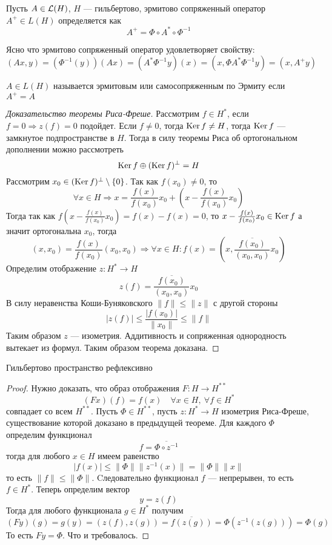 \begin{definition}
	Пусть $A \in \mathcal{L}(H)$, $H$ --- гильбертово, эрмитово сопряженный оператор $A^+ \in L(H)$ определяется как 
	$$
	A^+  =\Phi \circ A^* \circ \Phi^{-1}
	$$
\end{definition}
\begin{remark}
	Ясно что эрмитово сопряженный оператор удовлетворяет свойству:
	$$(Ax, y) = (\Phi^{-1}(y))(Ax) = (A^*\Phi^{-1}y)(x) = (x, \Phi A^* \Phi^{-1}y) = (x,A^+y)$$
\end{remark}
\begin{definition}
	$A \in L(H)$ называется эрмитовым или самосопряженным по Эрмиту если $A^+ = A$
\end{definition}

\begin{proof}[Доказательство теоремы Риса-Фреше]
	Рассмотрим $f \in H^*$, если $ f = 0 \Rightarrow z(f) = 0$ подойдет. Если $f \neq 0$, тогда $\operatorname{Ker} f \neq H$, тогда $\operatorname{Ker} f$ --- замкнутое подпространстве в $H$. Тогда в силу теоремы Риса об ортогональном дополнении можно рассмотреть
	$$
	\operatorname{Ker} f \oplus (\operatorname{Ker} f)^\perp  = H
	$$
	Рассмотрим $x_0 \in (\operatorname{Ker} f)^\perp \setminus \{0\}$. Так как $f(x_0) \neq 0$, то 
	$$
	\forall x \in H\Rightarrow x =\frac{f(x)}{f(x_0)}x_0 + \left(x - \frac{f(x)}{f(x_0)}x_0\right)
	$$
	Тогда так как $f\left(x - \frac{f(x)}{f(x_0)}x_0\right) = f(x) - f(x) = 0$, то $x - \frac{f(x)}{f(x_0)}x_0  \in \operatorname{Ker} f$ а значит ортогональна $x_0$, тогда
	$$
	(x,x_0) = \frac{f(x)}{f(x_0)}(x_0,x_0) \Rightarrow  \forall x \in H \colon f(x) = \left(x, \frac{\overline{f(x_0)}}{(x_0,x_0)}x_0\right)
	$$
	Определим отображение $z\colon H^* \to H$ 
	$$
	z(f) = \frac{\overline{f(x_0)}}{(x_0,x_0)}x_0
	$$
	В силу неравенства Коши-Буняковского $\|f\| \leq \|z\|$ с другой стороны
	$$
	|z(f)| \leq \frac{|f(x_0)|}{\|x_0\|} \leq \|f\|
	$$
	Таким образом $z$ --- изометрия. Аддитивность и сопряженная однородность вытекает из формул. Таким образом теорема доказана.
\end{proof}
\begin{next0}
	Гильбертово пространство рефлексивно
\end{next0}
\begin{proof}
	Нужно доказать, что образ отображения $F \colon H \to H^{**}$ 
	$$
	(Fx)(f) = f(x) \quad \forall x \in H, \ \forall f \in H^{*}
	$$
	совпадает со всем $H^{**}$. Пусть $\Phi \in H^{**}$, пусть $z\colon H^{*} \to H$ изометрия Риса-Фреше, существование которой доказано в предыдущей теореме. Для каждого $\Phi$ определим функционал  
	$$
	f = \overline{\Phi \circ z^{-1}}
	$$
	тогда для любого $x \in H$ имеем равенство 
	$$
	|f(x)| \leq \|\Phi\| \|z^{-1}(x)\|  = \|\Phi\| \|x\| 
	$$
	то есть $\|f\| \leq \|\Phi\|$. Cледовательно функционал $f$ --- непрерывен, то есть $f \in H^*$. Теперь определим вектор 
	$$
	y = z(f)
	$$
	Тогда для любого функционала $g \in H^*$ получим
	$$
	(Fy)(g) = g(y) = (z(f), z(g)) = \overline{f(z(g))} = \Phi(z^{-1}(z(g))) = \Phi(g)
	$$
	То есть $Fy = \Phi$. Что и требовалось.
\end{proof}